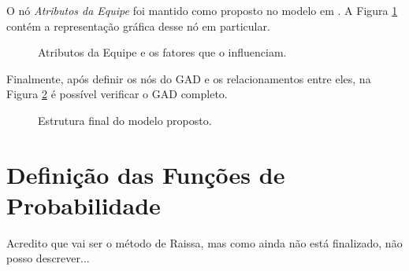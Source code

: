O nó \textit{Atributos da Equipe} foi mantido como proposto no modelo em \cite{freire}. A Figura \ref{modelo:gad:atributos} contém a representação gráfica desse nó em particular.

\begin{figure}[h!]	
\begin{center}
	\end{center}
	\caption{Atributos da Equipe e os fatores que o influenciam.}
	\label{modelo:gad:atributos}
\end{figure}

Finalmente, após definir os nós do GAD e os relacionamentos entre eles, na Figura \ref{modelo:gad:final} é possível verificar o GAD completo.

\begin{figure}[h!]	
\begin{center}
	\end{center}
	\caption{Estrutura final do modelo proposto.}
	\label{modelo:gad:final}
\end{figure}

\section{Definição das Funções de Probabilidade}
\label{modelo:funcoes}

{\color{red} Acredito que vai ser o método de Raissa, mas como ainda não está finalizado, não posso descrever...}
